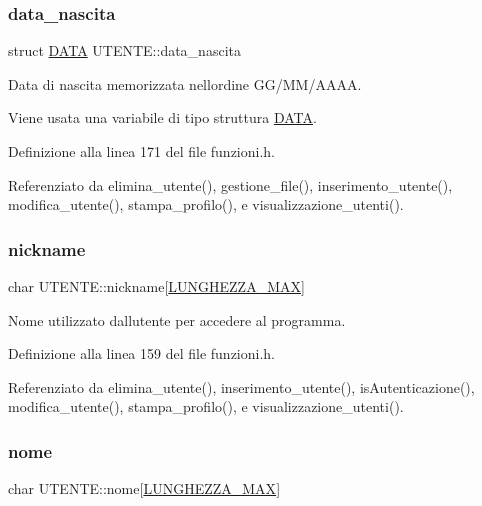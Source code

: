 \subsubsection{\texorpdfstring{data\+\_\+nascita}{data\_nascita}}
{\footnotesize\ttfamily struct \hyperlink{struct_d_a_t_a}{D\+A\+TA} U\+T\+E\+N\+T\+E\+::data\+\_\+nascita}



Data di nascita memorizzata nell\textquotesingle{}ordine G\+G/\+M\+M/\+A\+A\+AA. 

Viene usata una variabile di tipo struttura \hyperlink{struct_d_a_t_a}{D\+A\+TA}. 

Definizione alla linea 171 del file funzioni.\+h.



Referenziato da elimina\+\_\+utente(), gestione\+\_\+file(), inserimento\+\_\+utente(), modifica\+\_\+utente(), stampa\+\_\+profilo(), e visualizzazione\+\_\+utenti().

\mbox{\label{struct_u_t_e_n_t_e_a0ae0027764658fd60ce899a829b7b2fe}} 
\subsubsection{\texorpdfstring{nickname}{nickname}}
{\footnotesize\ttfamily char U\+T\+E\+N\+T\+E\+::nickname\mbox{[}\hyperlink{funzioni_8h_a2cdd71b92d6e869f8b094e32a6da6a62}{L\+U\+N\+G\+H\+E\+Z\+Z\+A\+\_\+\+M\+AX}\mbox{]}}

Nome utilizzato dall\textquotesingle{}utente per accedere al programma. 

Definizione alla linea 159 del file funzioni.\+h.



Referenziato da elimina\+\_\+utente(), inserimento\+\_\+utente(), is\+Autenticazione(), modifica\+\_\+utente(), stampa\+\_\+profilo(), e visualizzazione\+\_\+utenti().

\mbox{\label{struct_u_t_e_n_t_e_acd2869ae6d739de9978a588124906ae8}} 
\subsubsection{\texorpdfstring{nome}{nome}}
{\footnotesize\ttfamily char U\+T\+E\+N\+T\+E\+::nome\mbox{[}\hyperlink{funzioni_8h_a2cdd71b92d6e869f8b094e32a6da6a62}{L\+U\+N\+G\+H\+E\+Z\+Z\+A\+\_\+\+M\+AX}\mbox{]}}

